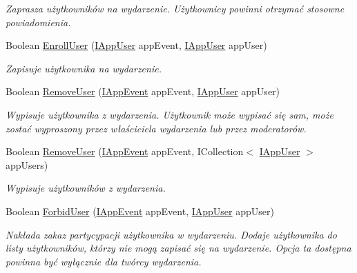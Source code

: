\begin{DoxyCompactItemize}
\begin{DoxyCompactList}\small\item\em Zaprasza użytkowników na wydarzenie. Użytkownicy powinni otrzymać stosowne powiadomienia. \end{DoxyCompactList}\item 
Boolean \hyperlink{interface_contract_1_1_i_app_event_service_ab38ba81f92630710c3963f21d2a2c6d9}{Enroll\+User} (\hyperlink{interface_contract_1_1_i_app_user}{I\+App\+User} app\+Event, \hyperlink{interface_contract_1_1_i_app_user}{I\+App\+User} app\+User)
\begin{DoxyCompactList}\small\item\em Zapisuje użytkownika na wydarzenie. \end{DoxyCompactList}\item 
Boolean \hyperlink{interface_contract_1_1_i_app_event_service_ae09bccf9eb9aecac41361ed6b62fe7ee}{Remove\+User} (\hyperlink{interface_contract_1_1_i_app_event}{I\+App\+Event} app\+Event, \hyperlink{interface_contract_1_1_i_app_user}{I\+App\+User} app\+User)
\begin{DoxyCompactList}\small\item\em Wypisuje użytkownika z wydarzenia. Użytkownik może wypisać się sam, może zostać wyproszony przez właściciela wydarzenia lub przez moderatorów. \end{DoxyCompactList}\item 
Boolean \hyperlink{interface_contract_1_1_i_app_event_service_a5d4ee6f582b1d006fe5891d1b1d7a251}{Remove\+User} (\hyperlink{interface_contract_1_1_i_app_event}{I\+App\+Event} app\+Event, I\+Collection$<$ \hyperlink{interface_contract_1_1_i_app_user}{I\+App\+User} $>$ app\+Users)
\begin{DoxyCompactList}\small\item\em Wypisuje użytkowników z wydarzenia. \end{DoxyCompactList}\item 
Boolean \hyperlink{interface_contract_1_1_i_app_event_service_a0ccea08ba533d1f8dda9c913ddf2be76}{Forbid\+User} (\hyperlink{interface_contract_1_1_i_app_event}{I\+App\+Event} app\+Event, \hyperlink{interface_contract_1_1_i_app_user}{I\+App\+User} app\+User)
\begin{DoxyCompactList}\small\item\em Nakłada zakaz partycypacji użytkownika w wydarzeniu. Dodaje użytkownika do listy użytkowników, którzy nie mogą zapisać się na wydarzenie. Opcja ta dostępna powinna być wyłącznie dla twórcy wydarzenia. \end{DoxyCompactList}\item 

\end{DoxyCompactItemize}

